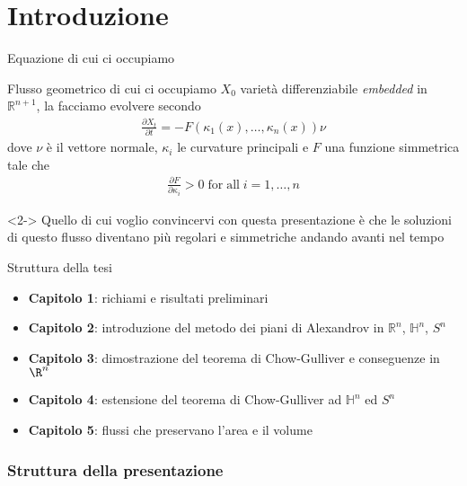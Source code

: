 \section{Introduzione}

\begin{frame}{Equazione di cui ci occupiamo}{}
	\begin{block}{Flusso geometrico di cui ci occupiamo}
		$X_0$ varietà differenziabile \textit{embedded} in $\mathbb{R}^{n+1}$, la facciamo evolvere secondo
		\begin{align*}
				\frac{\partial X_t}{\partial t} = - F(\kappa_1(x), \dots , \kappa_n(x)) \nu
		\end{align*}
		dove $\nu$ è il vettore normale, $\kappa_i$ le curvature principali e $F$ una funzione simmetrica tale che 
		\begin{align*}
			\frac{\partial F}{\partial \kappa_i} > 0 \mathrm{\; for \; all } \; i=1,\dots, n
		\end{align*}
		
	\end{block}
	\begin{block}{}<2->
		Quello di cui voglio convincervi con questa presentazione è che le soluzioni di questo flusso diventano più regolari e simmetriche andando avanti nel tempo
	\end{block}
\end{frame}


\begin{frame}{Struttura della tesi}{}

\begin{itemize}
	\item \textbf{Capitolo 1}: richiami e risultati preliminari 
	\item \textbf{Capitolo 2}: introduzione del metodo dei piani di Alexandrov in $\mathbb{R}^n$, $\mathbb{H}^n$, $S^n$
	\item \textbf{Capitolo 3}: dimostrazione del teorema di Chow-Gulliver e conseguenze in $\R^n$
	\item \textbf{Capitolo 4}: estensione del teorema di Chow-Gulliver ad $\mathbb{H}^n$ ed $S^n$ 
	\item \textbf{Capitolo 5}: flussi che preservano l'area e il volume
\end{itemize}
\end{frame}


\begin{frame}
	\frametitle{Struttura della presentazione}
	\tableofcontents
\end{frame}

